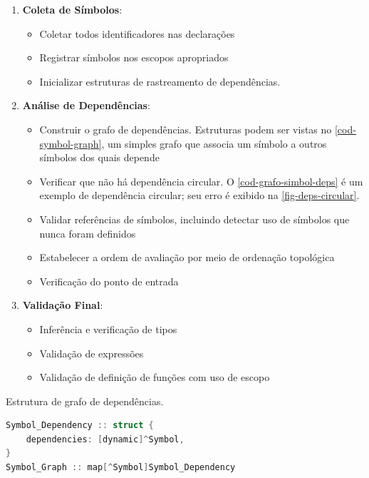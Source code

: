 \begin{enumerate}
    \item \textbf{Coleta de Símbolos}:
    \begin{itemize}
        \item Coletar todos identificadores nas declarações
        \item Registrar símbolos nos escopos apropriados
        \item Inicializar estruturas de rastreamento de dependências.     \end{itemize}

    \item \textbf{Análise de Dependências}:
    \begin{itemize}
        \item Construir o grafo de dependências. Estruturas podem ser vistas no \autoref{cod-symbol-graph}, um simples grafo que associa um símbolo a outros símbolos dos quais depende

        \item Verificar que não há dependência circular. O \autoref{cod-grafo-simbol-deps} é um exemplo de dependência circular; seu erro é exibido na \autoref{fig-deps-circular}.

        \item Validar referências de símbolos, incluindo detectar uso de símbolos que nunca foram definidos
        \item Estabelecer a ordem de avaliação por meio de ordenação topológica
        \item Verificação do ponto de entrada
    \end{itemize}

    \item \textbf{Validação Final}:
    \begin{itemize}
        \item Inferência e verificação de tipos
        \item Validação de expressões
        \item Validação de definição de funções com uso de escopo
    \end{itemize}
\end{enumerate}

\begin{codigo}[H]
\caption{\small Estrutura de grafo de dependências.}
    \label{cod-symbol-graph}
\begin{lstlisting}[language=C, frame=none, inputencoding=utf8]
Symbol_Dependency :: struct {
    dependencies: [dynamic]^Symbol,
}
Symbol_Graph :: map[^Symbol]Symbol_Dependency
\end{lstlisting}
\end{codigo}

